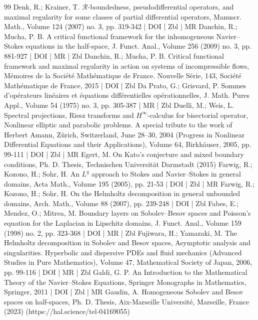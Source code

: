 \begin{thebibliography}{99}
 Denk, R.; Krainer, T. $\mathcal{R}$-boundedness, pseudodifferential operators, and maximal regularity for some classes of partial differential operators, Manuscr. Math., Volume 124 (2007) no. 3, pp. 319-342 | DOI | Zbl | MR
 Danchin, R.; Mucha, P. B. A critical functional framework for the inhomogeneous Navier–Stokes equations in the half-space, J. Funct. Anal., Volume 256 (2009) no. 3, pp. 881-927 | DOI | MR | Zbl
 Danchin, R.; Mucha, P. B. Critical functional framework and maximal regularity in action on systems of incompressible flows, Mémoires de la Société Mathématique de France. Nouvelle Série, 143, Société Mathématique de France, 2015 | DOI | Zbl
 Da Prato, G.; Grisvard, P. Sommes d’opérateurs linéaires et équations différentielles opérationnelles, J. Math. Pures Appl., Volume 54 (1975) no. 3, pp. 305-387 | MR | Zbl
 Duelli, M.; Weis, L. Spectral projections, Riesz transforms and ${H}^{\infty }$-calculus for bisectorial operator, Nonlinear elliptic and parabolic problems. A special tribute to the work of Herbert Amann, Zürich, Switzerland, June 28–30, 2004 (Progress in Nonlinear Differential Equations and their Applications), Volume 64, Birkhäuser, 2005, pp. 99-111 | DOI | Zbl | MR
 Egert, M. On Kato’s conjecture and mixed boundary conditions, Ph. D. Thesis, Technischen Universität Darmstadt (2015)
 Farwig, R.; Kozono, H.; Sohr, H. An ${L}^q$ approach to Stokes and Navier–Stokes in general domains, Acta Math., Volume 195 (2005), pp. 21-53 | DOI | Zbl | MR
 Farwig, R.; Kozono, H.; Sohr, H. On the Helmholtz decomposition in general unbounded domains, Arch. Math., Volume 88 (2007), pp. 239-248 | DOI | Zbl
 Fabes, E.; Mendez, O.; Mitrea, M. Boundary layers on Sobolev–Besov spaces and Poisson’s equation for the Laplacian in Lipschitz domains, J. Funct. Anal., Volume 159 (1998) no. 2, pp. 323-368 | DOI | MR | Zbl
 Fujiwara, H.; Yamazaki, M. The Helmholtz decomposition in Sobolev and Besov spaces, Asymptotic analysis and singularities. Hyperbolic and dispersive PDEs and fluid mechanics (Advanced Studies in Pure Mathematics), Volume 47, Mathematical Society of Japan, 2006, pp. 99-116 | DOI | MR | Zbl
 Galdi, G. P. An Introduction to the Mathematical Theory of the Navier–Stokes Equations, Springer Monographs in Mathematics, Springer, 2011 | DOI | Zbl | MR
 Gaudin, A. Homogeneous Sobolev and Besov spaces on half-spaces, Ph. D. Thesis, Aix-Marseille Université, Marseille, France (2023) (https://hal.science/tel-04169055)

\end{thebibliography}
